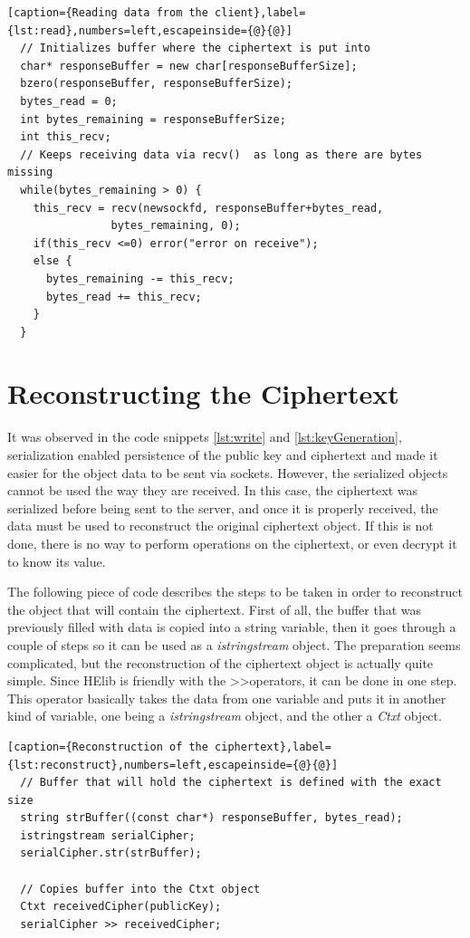 \begin{lstlisting}[caption={Reading data from the client},label={lst:read},numbers=left,escapeinside={@}{@}]
  // Initializes buffer where the ciphertext is put into
  char* responseBuffer = new char[responseBufferSize];
  bzero(responseBuffer, responseBufferSize);
  bytes_read = 0;
  int bytes_remaining = responseBufferSize;
  int this_recv;
  // Keeps receiving data via recv()  as long as there are bytes missing
  while(bytes_remaining > 0) {    
    this_recv = recv(newsockfd, responseBuffer+bytes_read,
                bytes_remaining, 0); 
    if(this_recv <=0) error("error on receive");
    else {
      bytes_remaining -= this_recv;
      bytes_read += this_recv;
    }
  }
\end{lstlisting}

\section{{Reconstructing the Ciphertext}}

It was observed in the code snippets \ref{lst:write} and \ref{lst:keyGeneration}, serialization enabled persistence of the public key and ciphertext and made it easier for the object data to be sent via sockets. However, the serialized objects cannot be used the way they are received. In this case, the ciphertext was serialized before being sent to the server, and once it is properly received, the data must be used to reconstruct the original ciphertext object.
If this is not done, there is no way to perform operations on the ciphertext, or even decrypt it to know its value.

The following piece of code describes the steps to be taken in order to reconstruct the object that will contain the ciphertext. First of all, the buffer that was previously filled with data is copied into a string variable, then it goes through a couple of steps so it can be used as a \textit{istringstream} object. The preparation seems complicated, but the reconstruction of the ciphertext object is actually quite simple. Since HElib is friendly with the \textgreater\textgreater operators, it can be done in one step. This operator basically takes the data from one variable and puts it in another kind of variable, one being a \textit{istringstream} object, and the other a \textit{Ctxt} object.

\begin{lstlisting}[caption={Reconstruction of the ciphertext},label={lst:reconstruct},numbers=left,escapeinside={@}{@}]
  // Buffer that will hold the ciphertext is defined with the exact size
  string strBuffer((const char*) responseBuffer, bytes_read);
  istringstream serialCipher;
  serialCipher.str(strBuffer);

  // Copies buffer into the Ctxt object
  Ctxt receivedCipher(publicKey);
  serialCipher >> receivedCipher;
\end{lstlisting}

